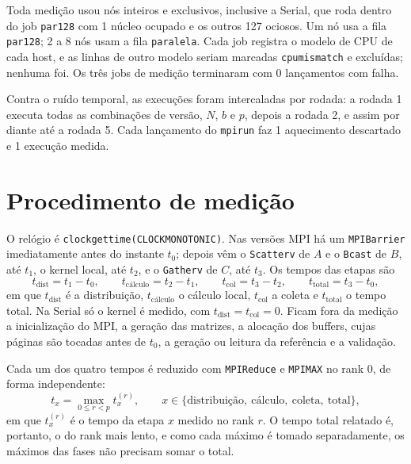 \documentclass[Portugues]{ic-tese-v3}
\DeclareRobustCommand{\_}{\textunderscore\allowbreak} %
\begin{document}
Toda medição usou nós inteiros e exclusivos, inclusive a Serial, que roda dentro do job \texttt{par128} com 1 núcleo ocupado e os outros 127 ociosos. Um nó usa a fila \texttt{par128}; 2 a 8 nós usam a fila \texttt{paralela}. Cada job registra o modelo de CPU de cada host, e as linhas de outro modelo seriam marcadas \texttt{cpu\_mismatch} e excluídas; nenhuma foi. Os três jobs de medição terminaram com 0 lançamentos com falha.

Contra o ruído temporal, as execuções foram intercaladas por rodada: a rodada 1 executa todas as combinações de versão, $N$, $b$ e $p$, depois a rodada 2, e assim por diante até a rodada 5. Cada lançamento do \texttt{mpirun} faz 1 aquecimento descartado e 1 execução medida.

\section{Procedimento de medição}\label{sec:proc}
O relógio é \texttt{clock\_gettime(CLOCK\_MONOTONIC)}. Nas versões MPI há um \texttt{MPI\_Barrier} imediatamente antes do instante $t_0$; depois vêm o \texttt{Scatterv} de $A$ e o \texttt{Bcast} de $B$, até $t_1$, o kernel local, até $t_2$, e o \texttt{Gatherv} de $C$, até $t_3$. Os tempos das etapas são
\begin{equation}\label{eq:fases}
t_{\mathrm{dist}} = t_1 - t_0, \qquad
t_{\textrm{cálculo}} = t_2 - t_1, \qquad
t_{\mathrm{col}} = t_3 - t_2, \qquad
t_{\mathrm{total}} = t_3 - t_0,
\end{equation}
em que $t_{\mathrm{dist}}$ é a distribuição, $t_{\textrm{cálculo}}$ o cálculo local, $t_{\mathrm{col}}$ a coleta e $t_{\mathrm{total}}$ o tempo total. Na Serial só o kernel é medido, com $t_{\mathrm{dist}} = t_{\mathrm{col}} = 0$. Ficam fora da medição a inicialização do MPI, a geração das matrizes, a alocação dos buffers, cujas páginas são tocadas antes de $t_0$, a geração ou leitura da referência e a validação.

Cada um dos quatro tempos é reduzido com \texttt{MPI\_Reduce} e \texttt{MPI\_MAX} no rank 0, de forma independente:
\begin{equation}\label{eq:max}
t_x = \max_{0 \le r < p} t_x^{(r)}, \qquad x \in \{\textrm{distribuição},\ \textrm{cálculo},\ \textrm{coleta},\ \mathrm{total}\},
\end{equation}
em que $t_x^{(r)}$ é o tempo da etapa $x$ medido no rank $r$. O tempo total relatado é, portanto, o do rank mais lento, e como cada máximo é tomado separadamente, os máximos das fases não precisam somar o total.
\end{document}
